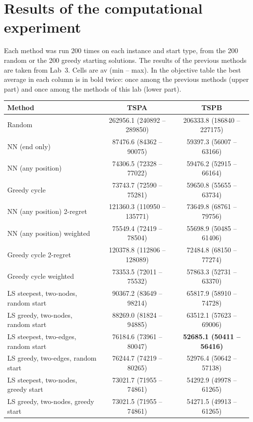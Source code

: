 \documentclass[11pt,a4paper]{article}
\begin{document}
\section{Results of the computational experiment}
Each method was run 200 times on each instance and start type, from the 200 random or the 200 greedy
starting solutions. The results
of the previous methods are taken from Lab~3. Cells are av (min -- max). In the objective table the
best average in each column is in bold twice: once among the previous methods (upper part) and once
among the methods of this lab (lower part).

\begin{table}[H]
\centering
\footnotesize
\begin{tabular}{lcc}
\toprule
Method & TSPA & TSPB \\
\midrule
Random & 262956.1 (240892 -- 289850) & 206333.8 (186840 -- 227175) \\
NN (end only) & 87476.6 (84362 -- 90075) & 59397.3 (56007 -- 63166) \\
NN (any position) & 74306.5 (72328 -- 77022) & 59476.2 (52915 -- 66164) \\
Greedy cycle & 73743.7 (72590 -- 75281) & 59650.8 (55655 -- 63734) \\
NN (any position) 2-regret & 121360.3 (110950 -- 135771) & 73649.8 (68761 -- 79756) \\
NN (any position) weighted & 75549.4 (72419 -- 78504) & 55698.9 (50485 -- 61406) \\
Greedy cycle 2-regret & 120378.8 (112806 -- 128089) & 72484.8 (68150 -- 77274) \\
Greedy cycle weighted & 73353.5 (72011 -- 75532) & 57863.3 (52731 -- 63370) \\
LS steepest, two-nodes, random start & 90367.2 (83649 -- 98214) & 65817.9 (58910 -- 74728) \\
LS greedy, two-nodes, random start & 88269.0 (81824 -- 94885) & 63512.1 (57623 -- 69006) \\
LS steepest, two-edges, random start & 76184.6 (73961 -- 80047) & \textbf{52685.1 (50411 -- 56416)} \\
LS greedy, two-edges, random start & 76244.7 (74219 -- 80265) & 52976.4 (50642 -- 57138) \\
LS steepest, two-nodes, greedy start & 73021.7 (71955 -- 74861) & 54292.9 (49978 -- 61265) \\
LS greedy, two-nodes, greedy start & 73021.5 (71955 -- 74861) & 54271.5 (49913 -- 61265) \\

\end{tabular}
\end{table}
\end{document}
